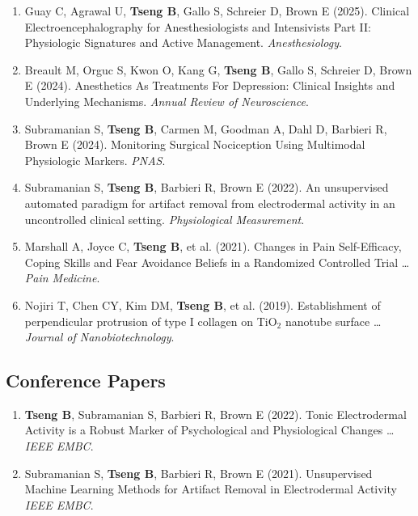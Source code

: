 \documentclass[11pt,letterpaper]{article}
\begin{document}
\begin{enumerate}
\item Guay C, Agrawal U, \textbf{Tseng B}, Gallo S, Schreier D, Brown E (2025). Clinical Electroencephalography for Anesthesiologists and Intensivists Part II: Physiologic Signatures and Active Management. \textit{Anesthesiology}.

\item Breault M, Orguc S, Kwon O, Kang G, \textbf{Tseng B}, Gallo S, Schreier D, Brown E (2024). Anesthetics As Treatments For Depression: Clinical Insights and Underlying Mechanisms. \textit{Annual Review of Neuroscience}.

\item Subramanian S, \textbf{Tseng B}, Carmen M, Goodman A, Dahl D, Barbieri R, Brown E (2024). Monitoring Surgical Nociception Using Multimodal Physiologic Markers. \textit{PNAS}.

\item Subramanian S, \textbf{Tseng B}, Barbieri R, Brown E (2022). An unsupervised automated paradigm for artifact removal from electrodermal activity in an uncontrolled clinical setting. \textit{Physiological Measurement}.

\item Marshall A, Joyce C, \textbf{Tseng B}, et al. (2021). Changes in Pain Self-Efficacy, Coping Skills and Fear Avoidance Beliefs in a Randomized Controlled Trial \ldots \textit{Pain Medicine}.

\item Nojiri T, Chen CY, Kim DM, \textbf{Tseng B}, et al. (2019). Establishment of perpendicular protrusion of type I collagen on TiO$_2$ nanotube surface \ldots \textit{Journal of Nanobiotechnology}.
\end{enumerate}

\subsection*{Conference Papers}

\begin{enumerate}
\item \textbf{Tseng B}, Subramanian S, Barbieri R, Brown E (2022). Tonic Electrodermal Activity is a Robust Marker of Psychological and Physiological Changes \ldots \textit{IEEE EMBC}.

\item Subramanian S, \textbf{Tseng B}, Barbieri R, Brown E (2021). Unsupervised Machine Learning Methods for Artifact Removal in Electrodermal Activity \textit{IEEE EMBC}.
\end{enumerate}
\end{document}
